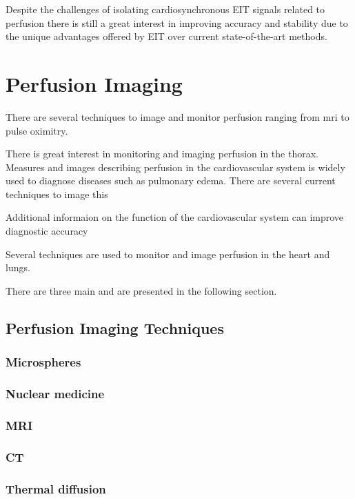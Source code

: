 Despite the challenges of isolating cardiosynchronous EIT signals related to 
perfusion there is still a great interest in 
improving accuracy and stability due to the unique 
advantages offered by EIT over current state-of-the-art methods.

\section{Perfusion Imaging}

There are several techniques to image and monitor perfusion ranging from
\acrfull{mri} to pulse oximitry. 


There is great interest in monitoring and imaging perfusion in the thorax.
Measures and images describing perfusion in the cardiovascular 
system is widely used to diagnose diseases such as pulmonary edema. 
There are several current techniques to image this


Additional informaion on the function of the cardiovascular system can
improve diagnostic accuracy 

Several techniques are used to monitor and image perfusion in the heart 
and lungs.

There are three main  
and are presented in the following section. 

\subsection{Perfusion Imaging Techniques}
\subsubsection{Microspheres}
\subsubsection{Nuclear medicine}
\subsubsection{MRI}
\subsubsection{CT}
\subsubsection{Thermal diffusion}
